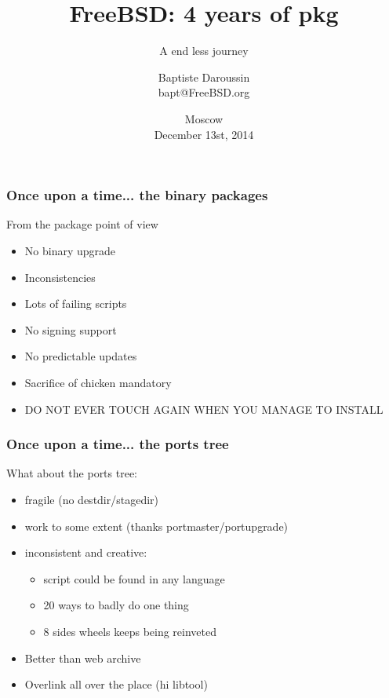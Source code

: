 
\newcommand{\prestitle}{RuBSD 14}

\title{FreeBSD: 4 years of pkg}
\subtitle{A end less journey}
\author{Baptiste Daroussin \\ bapt@FreeBSD.org}
\date{Moscow \\ December 13st, 2014}


\begin{frame}[plain]
	\titlepage
\end{frame}

\begin{frame}
	\frametitle{Once upon a time... the binary packages}
	From the package point of view
	\begin{itemize}
		\item No binary upgrade
		\item Inconsistencies
		\item Lots of failing scripts
		\item No signing support
		\item No predictable updates
		\item Sacrifice of chicken mandatory
		\item DO NOT EVER TOUCH AGAIN WHEN YOU MANAGE TO INSTALL
	\end{itemize}
\end{frame}

\begin{frame}
	\frametitle{Once upon a time... the ports tree}
	What about the ports tree:
	\begin{itemize}
		\item fragile (no destdir/stagedir)
		\item work to some extent (thanks portmaster/portupgrade)
		\item inconsistent and creative:
			\begin{itemize}
				\item script could be found in any language
				\item 20 ways to badly do one thing
				\item 8 sides wheels keeps being reinveted
			\end{itemize}
		\item Better than web archive
		\item Overlink all over the place (hi libtool)
	\end{itemize}
\end{frame}

